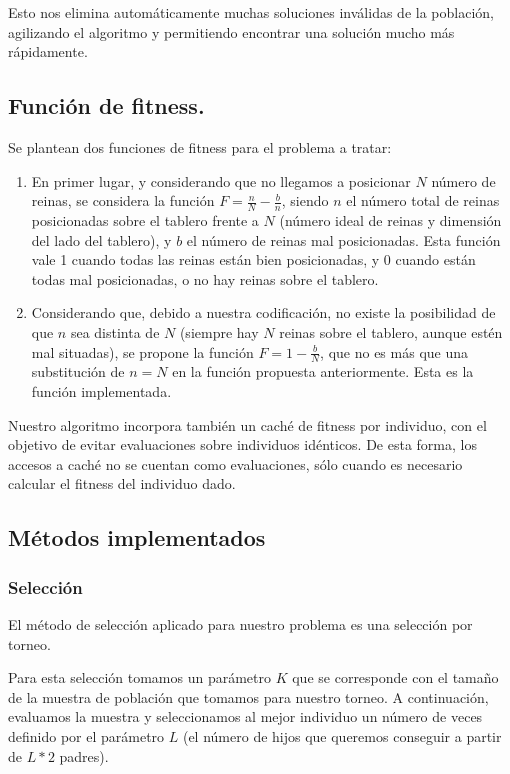 \documentclass[12pt]{article}
\begin{document}
Esto nos elimina automáticamente muchas soluciones inválidas de la población, agilizando el algoritmo y permitiendo encontrar una solución mucho más rápidamente.

\subsection{Función de fitness.}

Se plantean dos funciones de fitness para el problema a tratar:

\begin{enumerate}
    \item En primer lugar, y considerando que no llegamos a posicionar $N$ número de reinas, se considera la función $F=\frac{n}{N} - \frac{b}{n}$, siendo $n$ el número total de reinas posicionadas sobre el tablero frente a $N$ (número ideal de reinas y dimensión del lado del tablero), y $b$ el número de reinas mal posicionadas. Esta función vale 1 cuando todas las reinas están bien posicionadas, y 0 cuando están todas mal posicionadas, o no hay reinas sobre el tablero.
    \item Considerando que, debido a nuestra codificación, no existe la posibilidad de que $n$ sea distinta de $N$ (siempre hay $N$ reinas sobre el tablero, aunque estén mal situadas), se propone la función $F=1-\frac{b}{N}$, que no es más que una substitución de $n=N$ en la función propuesta anteriormente. Esta es la función implementada.
\end{enumerate}

Nuestro algoritmo incorpora también un caché de fitness por individuo, con el objetivo de evitar evaluaciones sobre individuos idénticos. De esta forma, los accesos a caché no se cuentan como evaluaciones, sólo cuando es necesario calcular el fitness del individuo dado.

\subsection{Métodos implementados}

\subsubsection{Selección}

El método de selección aplicado para nuestro problema es una selección por torneo.

Para esta selección tomamos un parámetro $K$ que se corresponde con el tamaño de la muestra de población que tomamos para nuestro torneo. A continuación, evaluamos la muestra y seleccionamos al mejor individuo un número de veces definido por el parámetro $L$ (el número de hijos que queremos conseguir a partir de $L*2$ padres).
\end{document}

